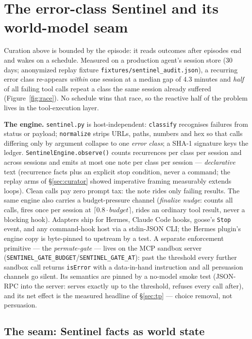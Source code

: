 \documentclass[11pt,a4paper]{article}
\newcommand{\hdr}[1]{\textbf{#1}}
\begin{document}
\section{The error-class Sentinel and its world-model seam}
\label{sec:sentinel}

Curation above is bounded by the episode: it reads outcomes after episodes
end and wakes on a schedule. Measured on a production agent's session store
(30 days; anonymized replay fixture \texttt{fixtures/sentinel\_audit.json}),
a recurring error class re-appears \emph{within} one session at a median gap
of 4.3 minutes and \emph{half} of all failing tool calls repeat a class the
same session already suffered (Figure~\ref{fig:race}). No schedule wins that
race, so the reactive half of the problem lives in the tool-execution layer.

\hdr{The engine.} \texttt{sentinel.py} is host-independent:
\texttt{classify} recognises failures from status or payload;
\texttt{normalize} strips URLs, paths, numbers and hex so that calls
differing only by argument collapse to one \emph{error class}; a SHA-1
signature keys the ledger. \texttt{SentinelEngine.observe()} counts
recurrences per class per session and across sessions and emits at most one
note per class per session --- \emph{declarative} text (recurrence facts
plus an explicit stop condition, never a command; the replay arms of
\S\ref{sec:curator} showed imperative framing measurably extends loops).
Clean calls pay zero prompt tax: the note rides only failing results. The
same engine also carries a budget-pressure channel (\emph{finalize nudge}:
counts all calls, fires once per session at $\lceil 0.8\cdot\mathit{budget}
\rceil$, rides an ordinary tool result, never a blocking hook). Adapters
ship for Hermes, Claude Code hooks, goose's \texttt{Stop} event, and any
command-hook host via a stdin-JSON CLI; the Hermes plugin's engine copy is
byte-pinned to upstream by a test. A separate enforcement primitive ---
the \emph{permute-gate} --- lives on the MCP sandbox server
(\texttt{SENTINEL\_GATE\_BUDGET}/\texttt{SENTINEL\_GATE\_AT}): past the
threshold every further sandbox call returns \texttt{isError} with a
data-in-hand instruction and all persuasion channels go silent. Its
semantics are pinned by a no-model smoke test (JSON-RPC into the server:
serves exactly up to the threshold, refuses every call after), and its net
effect is the measured headline of \S\ref{sec:tp} --- choice removal, not
persuasion.

\subsection{The seam: Sentinel facts as world state}
\label{sec:sentinel-seam}
\end{document}
